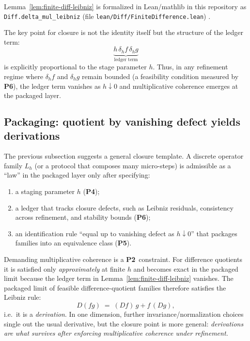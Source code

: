 \documentclass[apajournal,article,submit,moreauthors,pdftex]{Definitions/mdpi}
\newenvironment{remark}{\begin{Remark}}{\end{Remark}}
\newcommand{\Ptwo}{\textbf{P2}}
\newcommand{\Pfour}{\textbf{P4}}
\newcommand{\Pfive}{\textbf{P5}}
\newcommand{\Psix}{\textbf{P6}}
\begin{document}
\begin{remark}[Machine-checked anchor]\label{rem:lean-leibniz}
Lemma~\ref{lem:finite-diff-leibniz} is formalized in Lean/mathlib in this repository as
\texttt{Diff.delta\_mul\_leibniz} (file \texttt{lean/Diff/FiniteDifference.lean}) \cite{moura2021lean4,mathlib2020lean}.
\end{remark}

The key point for closure is not the identity itself but the structure of the ledger term:
\[
\underbrace{h\,\delta_h f\,\delta_h g}_{\text{ledger term}}
\]
is explicitly proportional to the stage parameter $h$.
Thus, in any refinement regime where $\delta_h f$ and $\delta_h g$ remain bounded (a feasibility condition measured by \Psix),
the ledger term vanishes as $h\downarrow 0$ and multiplicative coherence emerges at the packaged layer.

\subsection{Packaging: quotient by vanishing defect yields derivations}
The previous subsection suggests a general closure template.
A discrete operator family $L_h$ (or a protocol that composes many micro-steps) is admissible as a ``law'' in the packaged layer only after specifying:
\begin{enumerate}
  \item a staging parameter $h$ (\Pfour);
  \item a ledger that tracks closure defects, such as Leibniz residuals, consistency across refinement, and stability bounds (\Psix);
  \item an identification rule ``equal up to vanishing defect as $h\downarrow 0$'' that packages families into an equivalence class (\Pfive).
\end{enumerate}

Demanding multiplicative coherence is a \Ptwo\ constraint.
For difference quotients it is satisfied only \emph{approximately} at finite $h$ and becomes exact in the packaged limit because the ledger term in Lemma~\ref{lem:finite-diff-leibniz} vanishes.
The packaged limit of feasible difference-quotient families therefore satisfies the Leibniz rule:
\[
D(fg) \;=\; (Df)\,g + f\,(Dg),
\]
i.e.\ it is a \emph{derivation}.
In one dimension, further invariance/normalization choices single out the usual derivative, but the closure point is more general:
\emph{derivations are what survives after enforcing multiplicative coherence under refinement.}
\end{document}
